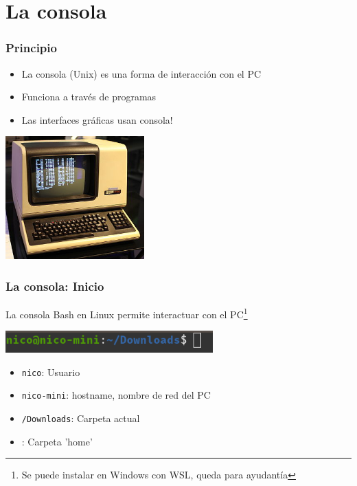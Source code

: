 \documentclass[14pt,aspectratio=169,xcolor=dvipsnames]{beamer}
\begin{document}
\section{La consola}
\begin{frame}\frametitle{Principio}
    \begin{itemize}
        \item La consola (Unix) es una forma de interacción con el PC
        \item Funciona a través de programas
        \item Las interfaces gráficas usan consola!
    \end{itemize}
    \begin{flushright}
        \includegraphics[width=0.4\textwidth]{../images/os-unix.png}
    \end{flushright}
\end{frame}
\begin{frame}\frametitle{La consola: Inicio}
La consola Bash en Linux permite interactuar con el PC\footnote{Se puede instalar en Windows con WSL, queda para ayudantía}

    \begin{center}
        \includegraphics[width=0.6\textwidth]{../images/consola.png}
    \end{center}
\begin{itemize}
    \item \texttt{nico}: Usuario
    \item \texttt{nico-mini}: hostname, nombre de red del PC
    \item \texttt{\texttilde/Downloads}: Carpeta actual
    \item \texttt{\texttilde}: Carpeta 'home'
\end{itemize}
\end{frame}
\end{document}
